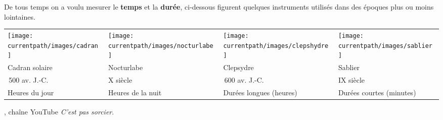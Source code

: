 \vspace*{-13mm}


\begin{debat}
    De tous temps on a voulu mesurer le {\bf temps} et la {\bf durée}, ci-dessous figurent 
    quelques instruments utilisés dans des époques plus ou moins lointaines. \\
    \textcolor{B1}{\small
    \begin{tabular}{*{4}{>{\centering\arraybackslash}p{3.5cm}}}
       \texttt{[image: \\currentpath/images/cadran]}
       &
       \texttt{[image: \\currentpath/images/nocturlabe]}
       &
       \texttt{[image: \\currentpath/images/clepshydre]}
       &
       \texttt{[image: \\currentpath/images/sablier]} \\
       Cadran solaire & Nocturlabe & Clepsydre & Sablier \\
       1\,500 av. J.-C. & X\up{e} siècle & 1\,600 av. J.-C. & IX\up{e} siècle \\
       Heures du jour & Heures de la nuit & Durées longues (heures) & Durées courtes (minutes) \\
    \end{tabular}}
    \begin{cadre}[B2][F4]
       \begin{center}
          , chaîne YouTube {\it C'est pas sorcier}.
       \end{center}
    \end{cadre}
 \end{debat}